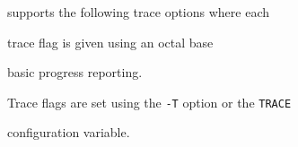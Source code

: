 









 supports the following trace options where each


trace flag is given using an octal base


\begin{optlist}


    basic progress reporting.


\end{optlist}


Trace flags are set using the \texttt{-T} option or the  \texttt{TRACE} 


configuration variable.




